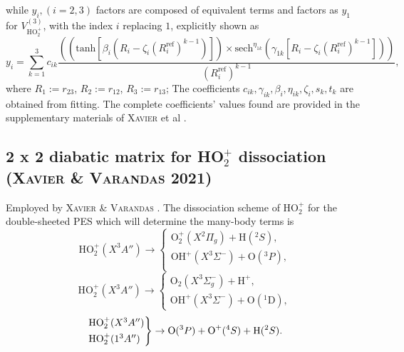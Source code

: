\documentclass[12pt]{article}
\begin{document}
while $y_i, (i=2,3)$ factors are composed of equivalent terms and factors as $y_1$ for $V^{(3)}_{\text{HO}_2^+}$, with the index $i$ replacing $1$, explicitly shown as
\begin{equation}
    y_i = \sum_{k=1}^3 c_{ik}\frac{((\text{tanh}\left[\beta_i(R_i - \zeta_i(R_i^\text{ref})^{k-1})\right]) \times \text{sech}^{\eta_{1k}}(\gamma_{1k}\left[R_i - \zeta_i(R_i^{\text{ref}})^{k-1}\right]))}{(R_i^{\text{ref}})^{k-1}},
\end{equation}
\fi%
where $R_1:=r_{23}$, $R_2:=r_{12}$, $R_3:=r_{13}$; The coefficients $c_{ik},  \gamma_{ik}, \beta_i, \eta_{ik}, \zeta_i, s_k, t_k$ are obtained from fitting. The complete coefficients' values found are provided in the supplementary materials of \textsc{Xavier} et al \cite{idx173}.


\subsection{2 x 2 diabatic matrix for HO$_2^+$ dissociation (\textsc{Xavier \& Varandas} 2021)}
\label{sub2x2diabatic}
Employed by \textsc{Xavier \& Varandas} \cite{idx149}. The dissociation scheme of HO$_2^+$ for the double-sheeted PES which will determine the many-body terms is
\begin{equation}
    \text{HO}_{2}^+(X^3A'') \rightarrow
    \begin{cases}
        \text{O}_2^+(X^2\Pi_g) + \text{H}(^2S),\\
        \text{OH}^+(X^3\Sigma^-) + \text{O}(^3P),\\
    \end{cases} 
    \label{2x2dissociation}
\end{equation}
\begin{equation}
    \text{HO}_{2}^+(X^3A'') \rightarrow
    \begin{cases}
        \text{O}_2(X^3\Sigma_g^-) + \text{H}^+,\\
        \text{OH}^+(X^3\Sigma^-) + \text{O}(^1\text{D}),
    \end{cases}
    \label{eq:2x2dissociation1}
\end{equation}
\begin{equation}
    \begin{rcases}
        \text{HO}_{2}^+(X^3A'') \\
        \text{HO}_{2}^+(1^3A'')
    \end{rcases}
    \rightarrow \text{O}(^3P) + \text{O}^+(^4S) +
    \text{H}(^2S).
    \label{2x2dissociation2}
\end{equation}
\end{document}
